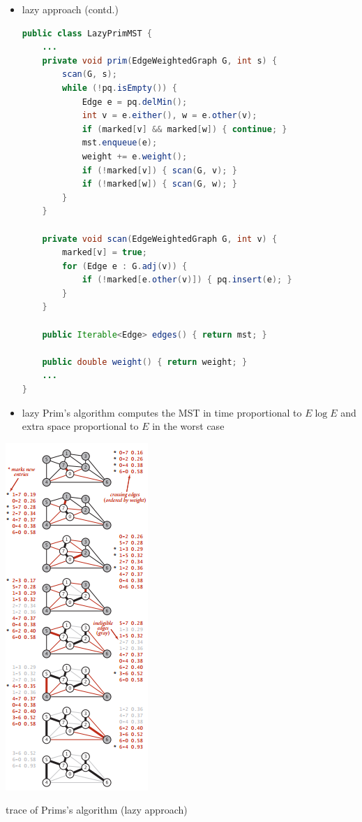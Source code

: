 \documentclass[8pt,a4paper,compress]{beamer}
\begin{document}
\begin{frame}[fragile]
\begin{minipage}{240pt}
\begin{itemize}
\item lazy approach (contd.) 
\begin{lstlisting}[language=Java]
public class LazyPrimMST {
    ...
    private void prim(EdgeWeightedGraph G, int s) {
        scan(G, s);
        while (!pq.isEmpty()) { 
            Edge e = pq.delMin(); 
            int v = e.either(), w = e.other(v);  
            if (marked[v] && marked[w]) { continue; }  
            mst.enqueue(e); 
            weight += e.weight();
            if (!marked[v]) { scan(G, v); }  
            if (!marked[w]) { scan(G, w); } 
        }
    }

    private void scan(EdgeWeightedGraph G, int v) {
        marked[v] = true;
        for (Edge e : G.adj(v)) {
            if (!marked[e.other(v)]) { pq.insert(e); }
        }
    }
    
    public Iterable<Edge> edges() { return mst; }

    public double weight() { return weight; }
    ...
}
\end{lstlisting}

\item lazy Prim's algorithm computes the MST in time proportional
to $E \log E$ and extra space proportional to $E$ in the worst case
\end{itemize}
\end{minipage}%
\begin{minipage}{90pt}
\begin{center}
\includegraphics[scale=0.4]{./figures/mst5.png}

\smallskip

\tiny trace of Prims's algorithm (lazy approach)
\end{center}
\end{minipage}
\end{frame}
\end{document}
